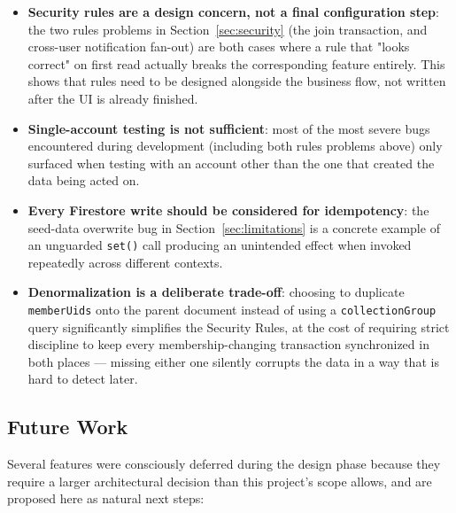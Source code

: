 \begin{itemize}
    \item \textbf{Security rules are a design concern, not a final configuration step}: the two rules problems in Section~\ref{sec:security} (the join transaction, and cross-user notification fan-out) are both cases where a rule that "looks correct" on first read actually breaks the corresponding feature entirely. This shows that rules need to be designed alongside the business flow, not written after the UI is already finished.
    \item \textbf{Single-account testing is not sufficient}: most of the most severe bugs encountered during development (including both rules problems above) only surfaced when testing with an account other than the one that created the data being acted on.
    \item \textbf{Every Firestore write should be considered for idempotency}: the seed-data overwrite bug in Section~\ref{sec:limitations} is a concrete example of an unguarded \texttt{set()} call producing an unintended effect when invoked repeatedly across different contexts.
    \item \textbf{Denormalization is a deliberate trade-off}: choosing to duplicate \texttt{memberUids} onto the parent document instead of using a \texttt{collectionGroup} query significantly simplifies the Security Rules, at the cost of requiring strict discipline to keep every membership-changing transaction synchronized in both places — missing either one silently corrupts the data in a way that is hard to detect later.
\end{itemize}

\subsection{Future Work}

Several features were consciously deferred during the design phase because they require a larger architectural decision than this project's scope allows, and are proposed here as natural next steps:

